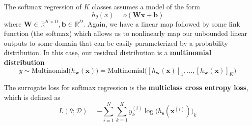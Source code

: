 \documentclass{article}
\begin{document}
    \begin{definition}
      The softmax regression of $K$ classes assumes a model of the form 
      \begin{equation}
        h_\theta (x) = o ( \mathbf{W} \mathbf{x} + \mathbf{b})
      \end{equation}
      where $\mathbf{W} \in \mathbb{R}^{K \times D}, \mathbf{b} \in \mathbb{R}^D$. Again, we have a linear map followed by some link function (the softmax) which allows us to nonlinearly map our unbounded linear outputs to some domain that can be easily parameterized by a probability distribution. In this case, our residual distribution is a \textbf{multinomial distribution} 
      \begin{equation}
        y \sim \mathrm{Multinomial}\big( h_\mathbf{w} (\mathbf{x}) \big) = \mathrm{Multinomial}\big( [h_\mathbf{w} (\mathbf{x})]_1, \ldots, [h_\mathbf{w} (\mathbf{x})]_K \big)
      \end{equation}
    \end{definition}

    \begin{definition}
      The surrogate loss for softmax regression is the \textbf{multiclass cross entropy loss}, which is defined as 
      \begin{equation}
        L(\theta ; \mathcal{D}) = - \sum_{i=1}^N \sum_{k=1}^K y_k^{(i)} \log \big( h_\theta (\mathbf{x}^{(i)}) \big)_k
      \end{equation}
    \end{definition}
\end{document}
